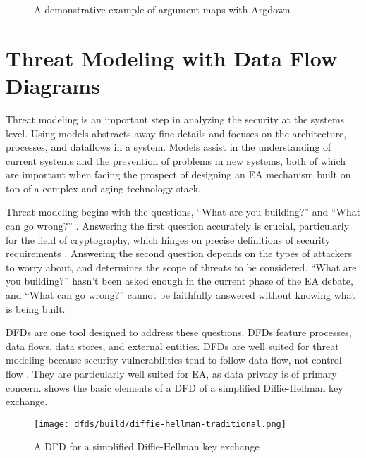 \begin{figure}[h]
    \centering\CaptionFontSize
    \caption{A demonstrative example of argument maps with Argdown}
    \label{fig-args-key}
\end{figure}


\section{Threat Modeling with Data Flow Diagrams}
\label{sec-threat-model-intro}

Threat modeling is an important step in analyzing the security at the systems level. Using models abstracts away fine
details and focuses on the architecture, processes, and dataflows in a system. Models assist in the understanding of
current systems and the prevention of problems in new systems, both of which are important when facing the prospect of
designing an \ac{EA} mechanism built on top of a complex and aging technology stack.

Threat modeling begins with the questions, ``What are you building?'' and ``What can go wrong?''
\cite{shostack_threat_2014}. Answering the first question accurately is crucial, particularly for the field of
cryptography, which hinges on precise definitions of security requirements \cite{varia_2018}. Answering the second
question depends on the types of attackers to worry about, and determines the scope of threats to be considered. ``What
are you building?'' hasn't been asked enough in the current phase of the \ac{EA} debate, and ``What can go wrong?''
cannot be faithfully answered without knowing what is being built.

\Acp{DFD} are one tool designed to address these questions. \Acp{DFD} feature processes, data flows, data stores, and
external entities. \Acp{DFD} are well suited for threat modeling because security vulnerabilities tend to follow data
flow, not control flow \cite{shostack_threat_2014}. They are particularly well suited for \ac{EA}, as data privacy is of
primary concern.  shows the basic elements of a \ac{DFD} of a simplified Diffie-Hellman
key exchange.

\begin{figure}[h]
    \centering\CaptionFontSize
    \texttt{[image: dfds/build/diffie-hellman-traditional.png]}
    \caption{A \acf{DFD} for a simplified Diffie-Hellman key exchange}
    \label{fig-dfd-dh-traditional}
\end{figure}


